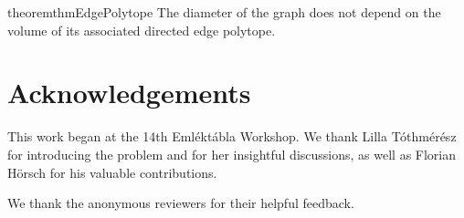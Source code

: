 \documentclass[11pt, twoside]{article}
\numberwithin{equation}{section}
\numberwithin{table}{section}
\numberwithin{figure}{section}
\newtheorem{theorem}{Theorem}[section]
\theoremstyle{definition}
\theoremstyle{definition}
\theoremstyle{definition}
\begin{document}
\begin{restatable}[$\star$]{theorem}{thmEdgePolytope}
\label{edge_polytope}
     The diameter of the graph does not depend on the volume of its associated directed edge polytope.
\end{restatable}

\section*{Acknowledgements}
This work began at the 14th Eml{\'e}kt{\'a}bla Workshop. We thank Lilla T{\'o}thm{\'e}r{\'e}sz for introducing the problem and for her insightful discussions, as well as Florian H{\"o}rsch for his valuable contributions.


We thank the anonymous reviewers for their helpful feedback.
\small





\end{document}
